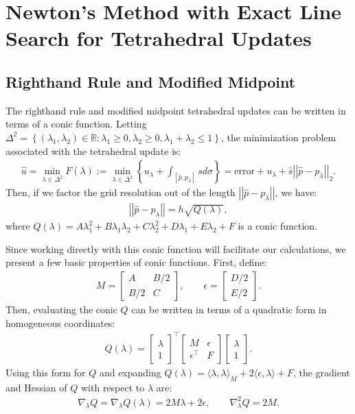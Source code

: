 \documentclass{article}
\newcommand{\R}{\mathbb{R}}
\newcommand{\norm}[1]{\left|\left|#1\right|\right|}
\newcommand{\set}[1]{\left\{#1\right\}}
\begin{document}
\section{Newton's Method with Exact Line Search for Tetrahedral Updates}

\subsection{Righthand Rule and Modified Midpoint}

The righthand rule and modified midpoint tetrahedral updates can be
written in terms of a conic function. Letting
$\Delta^2 = \set{(\lambda_1, \lambda_2) \in \R : \lambda_1 \geq 0,
  \lambda_2 \geq 0, \lambda_1 + \lambda_2 \leq 1}$, the minimization
problem associated with the tetrahedral update is:
\begin{align*}
  \hat{u} = \min_{\lambda \in \Delta^2} F(\lambda) := \min_{\lambda \in \Delta^2} \set{u_\lambda + \int_{[\hat{p}, p_\lambda]} s d\sigma} = \mbox{error} + u_\lambda + \hat{s} \norm{\hat{p} - p_\lambda}_2.
\end{align*}
Then, if we factor the grid resolution out of the length
$\norm{\hat{p} - p_\lambda}$, we have:
\begin{align*}
  \norm{\hat{p} - p_\lambda} = h \sqrt{Q(\lambda)},
\end{align*}
where
$Q(\lambda) = A\lambda_1^2 + B\lambda_1\lambda_2 + C\lambda_2^2 +
D\lambda_1 + E\lambda_2 + F$ is a conic function.

Since working directly with this conic function will facilitate our
calculations, we present a few basic properties of conic
functions. First, define:
\begin{align*}
  M = \begin{bmatrix} A & B/2 \\ B/2 & C \end{bmatrix}, \qquad \epsilon = \begin{bmatrix} D/2 \\ E/2 \end{bmatrix}.
\end{align*}
Then, evaluating the conic $Q$ can be written in terms of a quadratic
form in homogeneous coordinates:
\begin{align*}
  Q(\lambda) = \begin{bmatrix} \lambda \\ 1 \end{bmatrix}^\top \begin{bmatrix}
    M & \epsilon \\ \epsilon^\top & F \end{bmatrix} \begin{bmatrix} \lambda \\ 1 \end{bmatrix}.
\end{align*}
Using this form for $Q$ and expanding
$Q(\lambda) = \langle \lambda, \lambda \rangle_M + 2 \langle \epsilon,
\lambda \rangle + F$, the gradient and Hessian of $Q$ with respect to
$\lambda$ are:
\begin{align*}
  \nabla_\lambda Q = \nabla_\lambda Q(\lambda) = 2M\lambda + 2\epsilon, \qquad \nabla_\lambda^2 Q = 2M.
\end{align*}
\end{document}
